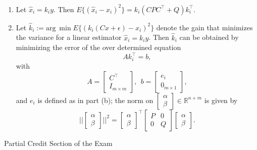 \documentclass[letterpaper]{article}
\newcommand{\real}{\mathbb R}  %
\begin{document}
\begin{enumerate}
\begin{enumerate}
\item  Let $\widehat{x}_i = k_i y$. Then
$E\{ \left( \widehat{x}_i - x_i \right)^2 \} =  k_i (C P C^\top + Q) k_i^\top. $

\item Let $\widehat{k}_i := \text{arg}~ \min E\{ \left( k_i (Cx+\epsilon)  - x_i \right)^2 \} $ denote the gain that minimizes the variance for a linear estimator $\widehat{x}_i = k_i y$. Then $\widehat{k}_i$ can be obtained by minimizing the error of the over determined equation
    $$ A k_i^\top = b, $$
    with $$A=\left[\begin{array}{c}  C^\top \\ I_{m\times m}\end{array} \right],~~b=\left[\begin{array}{c}  e_i \\ 0_{m\times 1}\end{array} \right],$$
and $e_i$ is defined as in part (b); the norm on $\left[ \begin{array}{c} \alpha \\ \beta\end{array} \right] \in \real^{n+m}$ is given by $$||\left[ \begin{array}{c} \alpha \\ \beta\end{array} \right]||^2 = \left[ \begin{array}{c} \alpha \\ \beta\end{array} \right]^\top \left[ \begin{array}{cc}  P & 0  \\ 0& Q \end{array} \right] \left[ \begin{array}{c} \alpha \\ \beta\end{array} \right].$$



\end{enumerate}


\end{enumerate}

\newpage



\newpage

\vspace*{.7in}
\begin{center}
\huge

Partial Credit Section of the Exam

\end{center}
\end{document}
